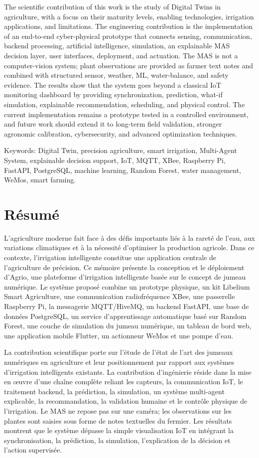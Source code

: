 The scientific contribution of this work is the study of Digital Twins in agriculture, with a focus on their maturity levels, enabling technologies, irrigation applications, and limitations. The engineering contribution is the implementation of an end-to-end cyber-physical prototype that connects sensing, communication, backend processing, artificial intelligence, simulation, an explainable MAS decision layer, user interfaces, deployment, and actuation. The MAS is not a computer-vision system; plant observations are provided as farmer text notes and combined with structured sensor, weather, ML, water-balance, and safety evidence. The results show that the system goes beyond a classical IoT monitoring dashboard by providing synchronization, prediction, what-if simulation, explainable recommendation, scheduling, and physical control. The current implementation remains a prototype tested in a controlled environment, and future work should extend it to long-term field validation, stronger agronomic calibration, cybersecurity, and advanced optimization techniques.

Keywords: Digital Twin, precision agriculture, smart irrigation, Multi-Agent System, explainable decision support, IoT, MQTT, XBee, Raspberry Pi, FastAPI, PostgreSQL, machine learning, Random Forest, water management, WeMos, smart farming.

\chapter*{Résumé}

L’agriculture moderne fait face à des défis importants liés à la rareté de l’eau, aux variations climatiques et à la nécessité d’optimiser la production agricole. Dans ce contexte, l’irrigation intelligente constitue une application centrale de l’agriculture de précision. Ce mémoire présente la conception et le déploiement d’Agrio, une plateforme d’irrigation intelligente basée sur le concept de jumeau numérique. Le système proposé combine un prototype physique, un kit Libelium Smart Agriculture, une communication radiofréquence XBee, une passerelle Raspberry Pi, la messagerie MQTT/HiveMQ, un backend FastAPI, une base de données PostgreSQL, un service d’apprentissage automatique basé sur Random Forest, une couche de simulation du jumeau numérique, un tableau de bord web, une application mobile Flutter, un actionneur WeMos et une pompe d’eau.

La contribution scientifique porte sur l’étude de l’état de l’art des jumeaux numériques en agriculture et leur positionnement par rapport aux systèmes d’irrigation intelligents existants. La contribution d’ingénierie réside dans la mise en œuvre d’une chaîne complète reliant les capteurs, la communication IoT, le traitement backend, la prédiction, la simulation, un système multi-agent explicable, la recommandation, la validation humaine et le contrôle physique de l’irrigation. Le MAS ne repose pas sur une caméra; les observations sur les plantes sont saisies sous forme de notes textuelles du fermier. Les résultats montrent que le système dépasse la simple visualisation IoT en intégrant la synchronisation, la prédiction, la simulation, l’explication de la décision et l’action supervisée.

